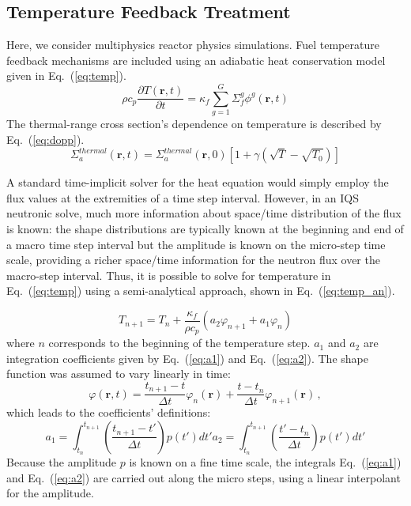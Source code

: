 \documentclass{elsarticle}
\renewcommand{\vec}[1]{\bm{#1}} %
\newcommand{\eqt}[1]{Eq.~(\ref{#1})}                     %
\newcommand{\be}{\begin{equation}}
\newcommand{\ee}{\end{equation}}
\begin{document}
\subsection{Temperature Feedback Treatment}

Here, we consider multiphysics reactor physics simulations.  Fuel temperature feedback mechanisms are included 
using an adiabatic heat conservation model given in \eqt{eq:temp}.  
\be
\rho c_p \frac{\partial T(\vec{r},t)}{\partial t} = \kappa_f \sum^G_{g=1}\Sigma_f^g \phi^g(\vec{r},t)
\label{eq:temp}
\ee
The thermal-range cross section's dependence on temperature is described by \eqt{eq:dopp}.
\be
\Sigma_a^{thermal}(\vec{r},t) = \Sigma_a^{thermal}(\vec{r},0)\left[1+\gamma\left(\sqrt{T}-\sqrt{T_0}\right)\right]
\label{eq:dopp}
\ee

A standard time-implicit solver for the heat equation would simply employ the flux values at 
the extremities of a time step interval.  However, in an IQS neutronic solve, much more information about 
space/time  distribution of the flux is known: the shape distributions are typically known at the beginning and end
of a macro time step interval but the amplitude is known on the micro-step time scale, providing
a richer space/time information for the neutron flux over the macro-step interval.  
Thus, it is possible to solve for temperature in \eqt{eq:temp} using a semi-analytical approach, 
shown in \eqt{eq:temp_an}.

\be
T_{n+1} = T_n + \frac{\kappa_f}{\rho c_p} \left(a_2 \varphi_{n+1} + a_1 \varphi_{n}\right)
\label{eq:temp_an}
\ee
where $n$ corresponds to the beginning of the temperature step.  $a_1$ and $a_2$ are integration coefficients 
given by \eqt{eq:a1} and \eqt{eq:a2}.  The shape function was assumed to vary linearly in time:
\be
\varphi(\vec{r},t) = \frac{t_{n+1}-t}{\Delta t}\varphi_{n}(\vec{r}) + \frac{t-t_n}{\Delta t}\varphi_{n+1}(\vec{r})  \,,
\ee
which leads to the coefficients' definitions:
\begin{subequations}
\be
a_1 = \int_{t_n}^{t_{n+1}}\left(\frac{t_{n+1}-t'}{\Delta t}\right)p(t')dt'
\label{eq:a1}
\ee
\be
a_2 = \int_{t_n}^{t_{n+1}}\left(\frac{t'-t_n}{\Delta t}\right)p(t')dt'
\label{eq:a2}
\ee
\end{subequations}
Because the amplitude $p$ is known on a fine time scale, the integrals \eqt{eq:a1} and \eqt{eq:a2}
are carried out along the micro steps, using a linear interpolant for the amplitude.
\end{document}
